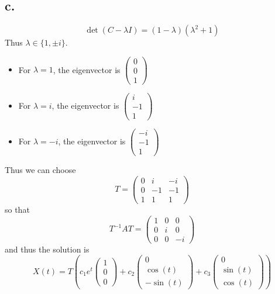 \documentclass[11pt]{article}
\theoremstyle{mystyle}
\theoremstyle{definition}
\begin{document}
\subsection*{c.}
\[
  \det(C-\lambda I) = (1-\lambda)(\lambda^2 + 1)
\]
Thus $\lambda \in \{1, \pm i\}$. \\
\begin{itemize}
  \item For $\lambda = 1$, the eigenvector is
    $  
    \begin{pmatrix}
      0 \\ 0 \\ 1 
    \end{pmatrix}
    $ 
  \item For $\lambda = i$, the eigenvector is
    $  
    \begin{pmatrix}
      i \\ -1 \\ 1 
    \end{pmatrix}
    $
  \item For $\lambda = -i$, the eigenvector is
    $  
    \begin{pmatrix}
      -i \\ -1 \\ 1 
    \end{pmatrix}
    $
\end{itemize}
Thus we can choose 
\[
  T = 
  \begin{pmatrix}
    0 & i & -i \\
    0 & -1 & -1 \\
    1 & 1 & 1
  \end{pmatrix}
\]
so that 
\[
  T^{-1}AT = 
  \begin{pmatrix}
    1 & 0 & 0 \\
    0 & i & 0 \\
    0 & 0 & -i
  \end{pmatrix}
\]
and thus the solution is 
\[
  X(t) = T \left(
  c_1 e^t 
  \begin{pmatrix}
    1 \\ 0 \\ 0
  \end{pmatrix}
  + c_2 
  \begin{pmatrix}
    0 \\ \cos(t) \\ -\sin(t)
  \end{pmatrix}
  + c_3 
  \begin{pmatrix}
    0 \\ \sin(t) \\ \cos(t)
  \end{pmatrix}
  \right)
\]
\newpage 
\end{document}
